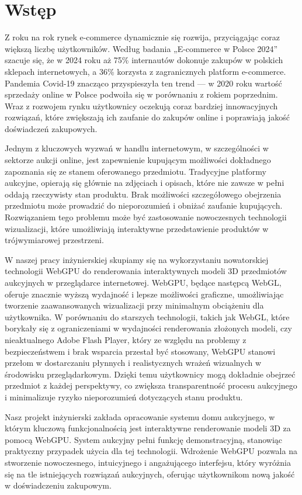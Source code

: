 \section{Wstęp}

Z roku na rok rynek e-commerce dynamicznie się rozwija, przyciągając coraz większą liczbę użytkowników. Według badania „E-commerce w Polsce 2024” szacuje się, że w 2024 roku aż 75\% internautów dokonuje zakupów w polskich sklepach internetowych, a 36\% korzysta z zagranicznych platform e-commerce. Pandemia Covid-19 znacząco przyspieszyła ten trend --- w 2020 roku wartość sprzedaży online w Polsce podwoiła się w porównaniu z rokiem poprzednim. Wraz z rozwojem rynku użytkownicy oczekują coraz bardziej innowacyjnych rozwiązań, które zwiększają ich zaufanie do zakupów online i poprawiają jakość doświadczeń zakupowych.

Jednym z kluczowych wyzwań w handlu internetowym, w szczególności w sektorze aukcji online, jest zapewnienie kupującym możliwości dokładnego zapoznania się ze stanem oferowanego przedmiotu. Tradycyjne platformy aukcyjne,   opierają się głównie na zdjęciach i opisach, które nie zawsze w pełni oddają rzeczywisty stan produktu. Brak możliwości szczegółowego obejrzenia przedmiotu może prowadzić do nieporozumień i obniżać zaufanie kupujących. Rozwiązaniem tego problemu może być zastosowanie nowoczesnych technologii wizualizacji, które umożliwiają interaktywne przedstawienie produktów w trójwymiarowej przestrzeni.

W naszej pracy inżynierskiej skupiamy się na wykorzystaniu nowatorskiej technologii WebGPU do renderowania interaktywnych modeli 3D przedmiotów aukcyjnych w przeglądarce internetowej. WebGPU, będące następcą WebGL, oferuje znacznie wyższą wydajność i lepsze możliwości graficzne, umożliwiając tworzenie zaawansowanych wizualizacji przy minimalnym obciążeniu dla użytkownika. W porównaniu do starszych technologii, takich jak WebGL, które borykały się z ograniczeniami w wydajności renderowania złożonych modeli, czy nieaktualnego Adobe Flash Player, który ze względu na problemy z bezpieczeństwem i brak wsparcia przestał być stosowany, WebGPU stanowi przełom w dostarczaniu płynnych i realistycznych wrażeń wizualnych w środowisku przeglądarkowym. Dzięki temu użytkownicy mogą dokładnie obejrzeć przedmiot z każdej perspektywy, co zwiększa transparentność procesu aukcyjnego i minimalizuje ryzyko nieporozumień dotyczących stanu produktu.

\begin{komentarz}
Nasz projekt inżynierski zakłada opracowanie systemu domu aukcyjnego, w którym kluczową funkcjonalnością jest interaktywne renderowanie modeli 3D za pomocą WebGPU. System aukcyjny pełni funkcję demonstracyjną, stanowiąc praktyczny przypadek użycia dla tej technologii. Wdrożenie WebGPU pozwala na stworzenie nowoczesnego, intuicyjnego i angażującego interfejsu, który wyróżnia się na tle istniejących rozwiązań aukcyjnych, oferując użytkownikom nową jakość w doświadczeniu zakupowym.
\end{komentarz}

\newpage
